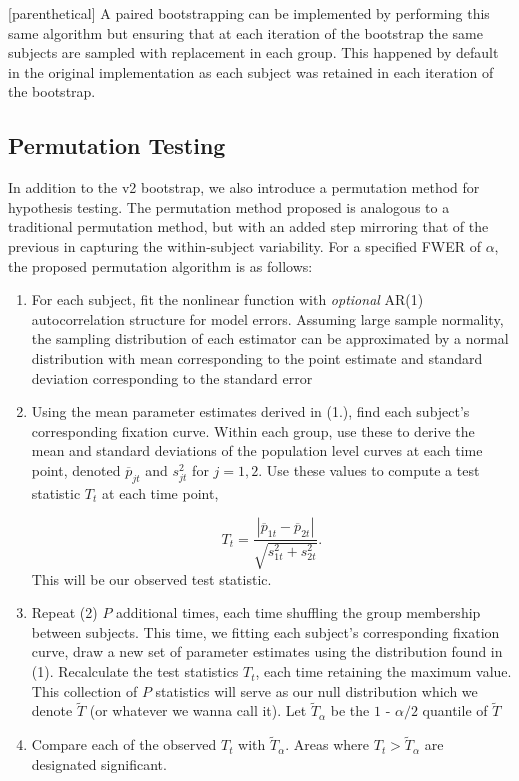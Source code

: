 \documentclass{article}
\begin{document}
[parenthetical] A paired bootstrapping can be implemented by performing this same algorithm but ensuring that at each iteration of the bootstrap the same subjects are sampled with replacement in each group. This happened by default in the original implementation as each subject was retained in each iteration of the bootstrap.


\subsection{Permutation Testing}

In addition to the v2 bootstrap, we also introduce a permutation method for hypothesis testing. The permutation method proposed is analogous to a traditional permutation method, but with an added step mirroring that of the previous in capturing the within-subject variability. For a specified FWER of $\alpha$, the proposed permutation algorithm is as follows:

\begin{singlespace}
\begin{enumerate}
\vspace{-2mm}
\item For each subject, fit the nonlinear function with \textit{optional} AR(1) autocorrelation structure for model errors. Assuming large sample normality, the sampling distribution of each estimator can be approximated by a normal distribution with mean corresponding to the point estimate and standard deviation corresponding to the standard error
\item Using the mean parameter estimates derived in (1.), find each subject's corresponding fixation curve. Within each group, use these to derive the mean and standard deviations of the population level curves at each time point, denoted $\overline{p}_{jt}$ and $s_{jt}^2$ for $j = 1,2$. Use these values to compute a test statistic $T_t$ at each time point,

\begin{equation}
T_t = \frac{|\overline{p}_{1t} - \overline{p}_{2t}|}{\sqrt{s_{1t}^2 + s_{2t}^2}}.
\end{equation}
This will be our observed test statistic.
\item Repeat (2) $P$  additional times, each time shuffling the group membership between subjects. This time, we fitting each subject's corresponding fixation curve, draw a new set of parameter estimates using the distribution found in (1). Recalculate the test statistics $T_t$, each time retaining the maximum value. This collection of $P$ statistics will serve as our null distribution which we denote $\widetilde{T}$ (or whatever we wanna call it). Let $\widetilde{T}_{\alpha}$ be the $1$ - $\alpha/2$ quantile of $\widetilde{T}$
\item Compare each of the observed $T_t$ with $\widetilde{T}_{\alpha}$. Areas where $T_t > \widetilde{T}_{\alpha}$ are designated significant. 
\end{enumerate}
\end{singlespace}
\end{document}
